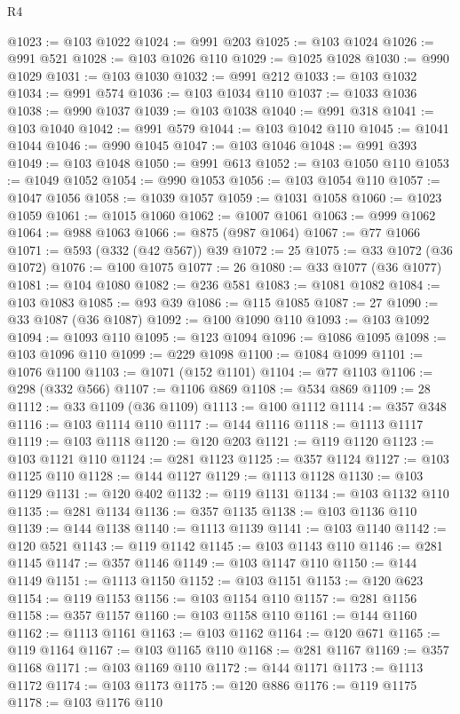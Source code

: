 \begin{lexlean}{R4}
\begin{coremodule}
@1023 := @103 @1022
@1024 := @991 @203
@1025 := @103 @1024
@1026 := @991 @521
@1028 := @103 @1026 @110
@1029 := @1025 @1028
@1030 := @990 @1029
@1031 := @103 @1030
@1032 := @991 @212
@1033 := @103 @1032
@1034 := @991 @574
@1036 := @103 @1034 @110
@1037 := @1033 @1036
@1038 := @990 @1037
@1039 := @103 @1038
@1040 := @991 @318
@1041 := @103 @1040
@1042 := @991 @579
@1044 := @103 @1042 @110
@1045 := @1041 @1044
@1046 := @990 @1045
@1047 := @103 @1046
@1048 := @991 @393
@1049 := @103 @1048
@1050 := @991 @613
@1052 := @103 @1050 @110
@1053 := @1049 @1052
@1054 := @990 @1053
@1056 := @103 @1054 @110
@1057 := @1047 @1056
@1058 := @1039 @1057
@1059 := @1031 @1058
@1060 := @1023 @1059
@1061 := @1015 @1060
@1062 := @1007 @1061
@1063 := @999 @1062
@1064 := @988 @1063
@1066 := @875 (@987 @1064)
@1067 := @77 @1066
@1071 := @593 (@332 (@42 @567)) @39
@1072 := 25
@1075 := @33 @1072 (@36 @1072)
@1076 := @100 @1075
@1077 := 26
@1080 := @33 @1077 (@36 @1077)
@1081 := @104 @1080
@1082 := @236 @581
@1083 := @1081 @1082
@1084 := @103 @1083
@1085 := @93 @39
@1086 := @115 @1085
@1087 := 27
@1090 := @33 @1087 (@36 @1087)
@1092 := @100 @1090 @110
@1093 := @103 @1092
@1094 := @1093 @110
@1095 := @123 @1094
@1096 := @1086 @1095
@1098 := @103 @1096 @110
@1099 := @229 @1098
@1100 := @1084 @1099
@1101 := @1076 @1100
@1103 := @1071 (@152 @1101)
@1104 := @77 @1103
@1106 := @298 (@332 @566)
@1107 := @1106 @869
@1108 := @534 @869
@1109 := 28
@1112 := @33 @1109 (@36 @1109)
@1113 := @100 @1112
@1114 := @357 @348
@1116 := @103 @1114 @110
@1117 := @144 @1116
@1118 := @1113 @1117
@1119 := @103 @1118
@1120 := @120 @203
@1121 := @119 @1120
@1123 := @103 @1121 @110
@1124 := @281 @1123
@1125 := @357 @1124
@1127 := @103 @1125 @110
@1128 := @144 @1127
@1129 := @1113 @1128
@1130 := @103 @1129
@1131 := @120 @402
@1132 := @119 @1131
@1134 := @103 @1132 @110
@1135 := @281 @1134
@1136 := @357 @1135
@1138 := @103 @1136 @110
@1139 := @144 @1138
@1140 := @1113 @1139
@1141 := @103 @1140
@1142 := @120 @521
@1143 := @119 @1142
@1145 := @103 @1143 @110
@1146 := @281 @1145
@1147 := @357 @1146
@1149 := @103 @1147 @110
@1150 := @144 @1149
@1151 := @1113 @1150
@1152 := @103 @1151
@1153 := @120 @623
@1154 := @119 @1153
@1156 := @103 @1154 @110
@1157 := @281 @1156
@1158 := @357 @1157
@1160 := @103 @1158 @110
@1161 := @144 @1160
@1162 := @1113 @1161
@1163 := @103 @1162
@1164 := @120 @671
@1165 := @119 @1164
@1167 := @103 @1165 @110
@1168 := @281 @1167
@1169 := @357 @1168
@1171 := @103 @1169 @110
@1172 := @144 @1171
@1173 := @1113 @1172
@1174 := @103 @1173
@1175 := @120 @886
@1176 := @119 @1175
@1178 := @103 @1176 @110

\end{coremodule}
\end{lexlean}
